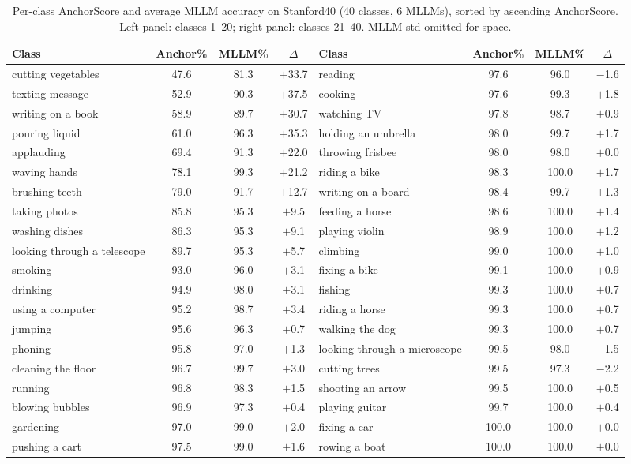 \documentclass[11pt,a4paper]{article}
\begin{document}
\begin{table}[t]
\caption{Per-class AnchorScore and average MLLM accuracy on Stanford40 (40 classes, 6 MLLMs), sorted by ascending AnchorScore. Left panel: classes 1--20; right panel: classes 21--40. MLLM std omitted for space.}
\label{tab:stanford40_per_class}
\centering
\footnotesize
\setlength{\tabcolsep}{3pt}
\begin{tabular}{lccc@{\hspace{1.8em}}lccc}
\toprule
\textbf{Class} & \textbf{Anchor\%} & \textbf{MLLM\%} & $\Delta$ & \textbf{Class} & \textbf{Anchor\%} & \textbf{MLLM\%} & $\Delta$ \\
\midrule
cutting vegetables & 47.6 & 81.3 & $+$33.7 & reading & 97.6 & 96.0 & $-$1.6 \\
texting message & 52.9 & 90.3 & $+$37.5 & cooking & 97.6 & 99.3 & $+$1.8 \\
writing on a book & 58.9 & 89.7 & $+$30.7 & watching TV & 97.8 & 98.7 & $+$0.9 \\
pouring liquid & 61.0 & 96.3 & $+$35.3 & holding an umbrella & 98.0 & 99.7 & $+$1.7 \\
applauding & 69.4 & 91.3 & $+$22.0 & throwing frisbee & 98.0 & 98.0 & $+$0.0 \\
waving hands & 78.1 & 99.3 & $+$21.2 & riding a bike & 98.3 & 100.0 & $+$1.7 \\
brushing teeth & 79.0 & 91.7 & $+$12.7 & writing on a board & 98.4 & 99.7 & $+$1.3 \\
taking photos & 85.8 & 95.3 & $+$9.5 & feeding a horse & 98.6 & 100.0 & $+$1.4 \\
washing dishes & 86.3 & 95.3 & $+$9.1 & playing violin & 98.9 & 100.0 & $+$1.2 \\
looking through a telescope & 89.7 & 95.3 & $+$5.7 & climbing & 99.0 & 100.0 & $+$1.0 \\
smoking & 93.0 & 96.0 & $+$3.1 & fixing a bike & 99.1 & 100.0 & $+$0.9 \\
drinking & 94.9 & 98.0 & $+$3.1 & fishing & 99.3 & 100.0 & $+$0.7 \\
using a computer & 95.2 & 98.7 & $+$3.4 & riding a horse & 99.3 & 100.0 & $+$0.7 \\
jumping & 95.6 & 96.3 & $+$0.7 & walking the dog & 99.3 & 100.0 & $+$0.7 \\
phoning & 95.8 & 97.0 & $+$1.3 & looking through a microscope & 99.5 & 98.0 & $-$1.5 \\
cleaning the floor & 96.7 & 99.7 & $+$3.0 & cutting trees & 99.5 & 97.3 & $-$2.2 \\
running & 96.8 & 98.3 & $+$1.5 & shooting an arrow & 99.5 & 100.0 & $+$0.5 \\
blowing bubbles & 96.9 & 97.3 & $+$0.4 & playing guitar & 99.7 & 100.0 & $+$0.4 \\
gardening & 97.0 & 99.0 & $+$2.0 & fixing a car & 100.0 & 100.0 & $+$0.0 \\
pushing a cart & 97.5 & 99.0 & $+$1.6 & rowing a boat & 100.0 & 100.0 & $+$0.0 \\
\bottomrule
\end{tabular}
\end{table}
\end{document}
